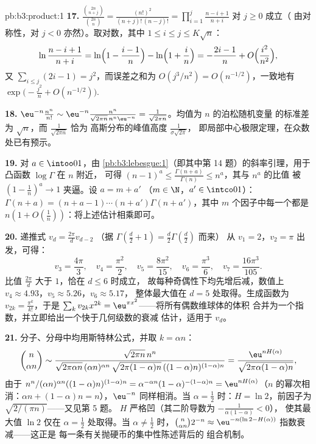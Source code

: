 \begin{solution}{pb:b3:product:1}
\textbf{17.} $\frac{\binom{2n}{n+j}}{\binom{2n}n} =
\frac{(n!)^2}{(n+j)!\,(n-j)!} =
\prod_{i=1}^{j}\frac{n-i+1}{n+i}$ 对 $j \geq 0$ 成立（
由对称性，对 $j < 0$ 亦然）。取对数，其中 $1 \leq i
\leq j \leq K\sqrt n$：
\[
\ln\frac{n-i+1}{n+i} = \ln\Bigl(1 - \frac{i-1}n\Bigr) -
\ln\Bigl(1 + \frac in\Bigr) = -\frac{2i-1}{n} +
O\Bigl(\frac{i^2}{n^2}\Bigr),
\]
又 $\sum_{i\leq j}(2i - 1) = j^2$，而误差之和为
$O(j^3/n^2) = O(n^{-1/2})$，一致地有
$\exp\bigl(-\frac{j^2}n + O(n^{-1/2})\bigr)$.

\textbf{18.} $\eu^{-n}\frac{n^n}{n!} \sim \eu^{-n}
\frac{n^n}{\sqrt{2\pi n}\,n^n\eu^{-n}} =
\frac1{\sqrt{2\pi n}}$。均值为 $n$ 的泊松随机变量
的标准差为 $\sqrt n$，而 $\frac1{\sqrt{2\pi n}}$ 恰为
高斯分布的峰值高度 $\frac1{\sigma\sqrt{2\pi}}$，
即局部中心极限定理，在众数处已有预示。

\textbf{19.} 对 $a \in \intoo01$，由
\cref{pb:b3:lebesgue:1}（即其中第 14 题）的斜率引理，用于凸函数 $\log\Gamma$ 在 $n$ 附近，
可得 $(n-1)^a \leq
\frac{\Gamma(n+a)}{\Gamma(n)} \leq n^a$，其与 $n^a$ 的比值
被 $(1 - \frac1n)^a \to 1$ 夹逼。设 $a = m + a'$
（$m \in \N$，$a' \in \intco01$）：$\Gamma(n+a) = (n + a - 1)
\cdots(n + a')\Gamma(n + a')$，其中 $m$ 个因子中每一个都是
$n(1 + O(\frac1n))$：将上述估计相乘即可。

\textbf{20.} 递推式 $v_d = \frac{2\pi}dv_{d-2}$
（据 $\Gamma(\frac d2 + 1) = \frac d2\Gamma(\frac d2)$ 而来）
从 $v_1 = 2$，$v_2 = \pi$ 出发，可得：
\[
v_3 = \frac{4\pi}3,\quad v_4 = \frac{\pi^2}2,\quad
v_5 = \frac{8\pi^2}{15},\quad v_6 = \frac{\pi^3}6,\quad
v_7 = \frac{16\pi^3}{105}.
\]
比值 $\frac{2\pi}d$ 大于 $1$，恰在 $d \leq 6$ 时成立，
故每种奇偶性下均先增后减，数值上 $v_4
\approx 4.93$，$v_5 \approx 5.26$，$v_6 \approx 5.17$，
整体最大值在 $d = 5$ 处取得。生成函数为 $v_{2k} =
\frac{\pi^k}{k!}$，于是 $\sum_kv_{2k}x^{2k} =
\eu^{\pi x^2}$——将所有偶数维球体的体积
合并为一个指数，并立即给出一个快于几何级数的衰减
估计，适用于 $v_d$。

\textbf{21.} 分子、分母中均用斯特林公式，并取 $k =
\alpha n$：
\[
\binom n{\alpha n} \sim
\frac{\sqrt{2\pi n}\,n^n}
{\sqrt{2\pi\alpha n}\,(\alpha n)^{\alpha n}\,
\sqrt{2\pi(1-\alpha)n}\,((1-\alpha)n)^{(1-\alpha)n}}
= \frac{\eu^{nH(\alpha)}}{\sqrt{2\pi\alpha(1-\alpha)n}},
\]
由于 $n^n/(\alpha n)^{\alpha n}((1-\alpha)n)^{(1-\alpha)n} =
\alpha^{-\alpha n}(1-\alpha)^{-(1-\alpha)n} =
\eu^{nH(\alpha)}$（$n$ 的幂次相消：$\alpha n +
(1-\alpha)n = n$），$\eu^{-n}$ 同样相消。当
$\alpha = \frac12$ 时：$H = \ln2$，前因子为
$\sqrt{2/(\pi n)}$——又见第 5 题。
$H$ 严格凹（其二阶导数为 $-\frac1{\alpha(1-\alpha)} < 0$），
使其最大值 $\ln 2$ 仅在 $\alpha = \frac12$ 处取得。当
$\alpha \neq \frac12$ 时，$\binom n{\alpha n}2^{-n} \approx
\eu^{-n(\ln2 - H(\alpha))}$ 指数衰减——这正是
每一条有关抛硬币的集中性陈述背后的
组合机制。


\end{solution}
